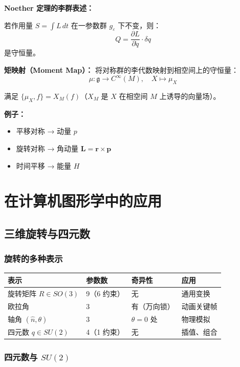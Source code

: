 \textbf{Noether 定理的李群表述：}

若作用量 $S = \int L\,dt$ 在一参数群 $g_\varepsilon$ 下不变，则：
\[
Q = \frac{\partial L}{\partial \dot{q}} \cdot \delta q
\]
是守恒量。

\textbf{矩映射（Moment Map）：} 将对称群的李代数映射到相空间上的守恒量：
\[
\mu: \mathfrak{g} \to C^\infty(M), \quad X \mapsto \mu_X
\]

满足 $\{\mu_X, f\} = X_M(f)$（$X_M$ 是 $X$ 在相空间 $M$ 上诱导的向量场）。

\textbf{例子：}
\begin{itemize}
  \item 平移对称 → 动量 $p$
  \item 旋转对称 → 角动量 $\mathbf{L} = \mathbf{r} \times \mathbf{p}$
  \item 时间平移 → 能量 $H$
\end{itemize}

\section{在计算机图形学中的应用}

\subsection{三维旋转与四元数}

\subsubsection{旋转的多种表示}

\begin{center}
\begin{tabular}{p{3cm}p{3cm}p{3cm}p{3cm}}
\toprule
\textbf{表示} & \textbf{参数数} & \textbf{奇异性} & \textbf{应用} \\
\midrule
旋转矩阵 $R \in SO(3)$ & 9（6 约束） & 无 & 通用变换 \\
欧拉角 & 3 & 有（万向锁） & 动画关键帧 \\
轴角 $(\hat{n}, \theta)$ & 3 & $\theta = 0$ 处 & 物理模拟 \\
四元数 $q \in SU(2)$ & 4（1 约束） & 无 & 插值、组合 \\
\bottomrule
\end{tabular}
\end{center}

\subsubsection{四元数与 $SU(2)$}

